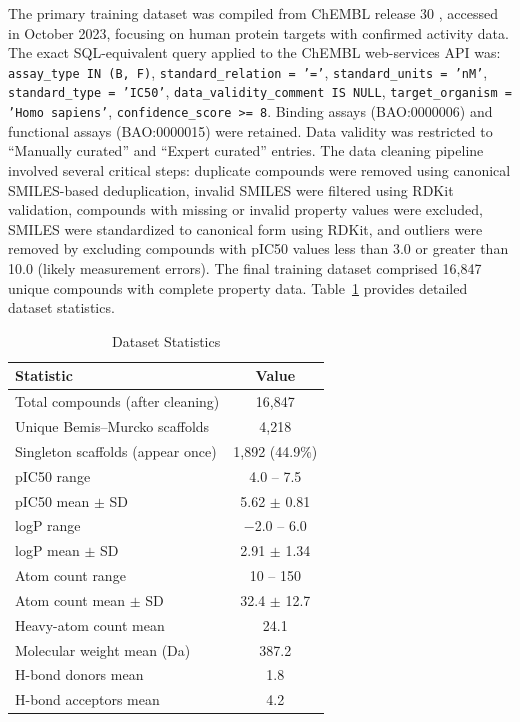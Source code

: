 \documentclass[preprint,12pt]{elsarticle}
\begin{document}
The primary training dataset was compiled from ChEMBL release 30 \cite{gaulton2012chembl,mendez2019chembl}, accessed in October 2023, focusing on human protein targets with confirmed activity data. The exact SQL-equivalent query applied to the ChEMBL web-services API was:
\texttt{assay\_type IN (B, F)}, \texttt{standard\_relation = '='},
\texttt{standard\_units = 'nM'}, \texttt{standard\_type = 'IC50'},
\texttt{data\_validity\_comment IS NULL},
\texttt{target\_organism = 'Homo sapiens'},
\texttt{confidence\_score >= 8}.
Binding assays (BAO:0000006) and functional assays (BAO:0000015) were retained. Data validity was restricted to ``Manually curated'' and ``Expert curated'' entries. The data cleaning pipeline involved several critical steps: duplicate compounds were removed using canonical SMILES-based deduplication, invalid SMILES were filtered using RDKit validation, compounds with missing or invalid property values were excluded, SMILES were standardized to canonical form using RDKit, and outliers were removed by excluding compounds with pIC50 values less than 3.0 or greater than 10.0 (likely measurement errors). The final training dataset comprised 16,847 unique compounds with complete property data. Table~\ref{tab:dataset_statistics} provides detailed dataset statistics.

\begin{table}[H]
\centering
\caption{Dataset Statistics}
\label{tab:dataset_statistics}
\small
\begin{tabular}{l c}
\toprule
\textbf{Statistic} & \textbf{Value} \\
\midrule
Total compounds (after cleaning) & 16,847 \\
Unique Bemis--Murcko scaffolds & 4,218 \\
Singleton scaffolds (appear once) & 1,892 (44.9\%) \\
\midrule
pIC50 range & 4.0 -- 7.5 \\
pIC50 mean $\pm$ SD & 5.62 $\pm$ 0.81 \\
logP range & $-$2.0 -- 6.0 \\
logP mean $\pm$ SD & 2.91 $\pm$ 1.34 \\
Atom count range & 10 -- 150 \\
Atom count mean $\pm$ SD & 32.4 $\pm$ 12.7 \\
\midrule
Heavy-atom count mean & 24.1 \\
Molecular weight mean (Da) & 387.2 \\
H-bond donors mean & 1.8 \\
H-bond acceptors mean & 4.2 \\
\bottomrule
\end{tabular}
\end{table}
\end{document}
